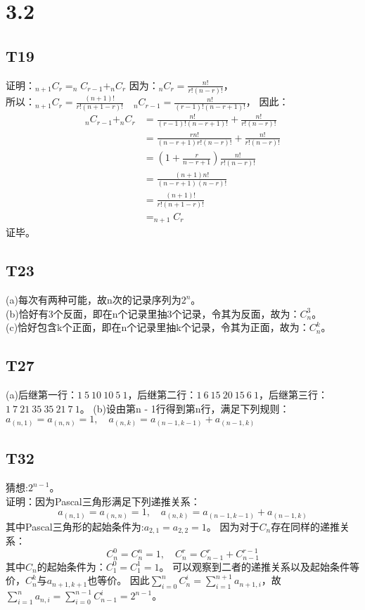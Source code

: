 \documentclass{article}
\begin{document}
\section{3.2}
\subsection{T19}
证明：$_{n+1}C_{r} = _nC_{r-1} + _nC_r$
因为：$_nC_r = \frac{n!}{r!(n-r)!}$，\\
所以：$_{n+1}C_r = \frac{(n + 1)!}{r!(n+1 - r)!} \quad _nC_{r-1} = \frac{n!}{(r - 1)!(n - r +  1)!}$，
因此：
\begin{align*}
    _nC_{r-1} + _nC_{r} &= \frac{n!}{(r - 1)!(n - r +  1)!} + \frac{n!}{r!(n-r)!}\\
    &= \frac{rn!}{(n - r + 1)r!(n-r)!} + \frac{n!}{r!(n-r)!}\\
    &= \left(1 + \frac{r}{n-r+1}\right)\frac{n!}{r!(n-r)!}\\
    &= \frac{(n + 1)n!}{(n - r + 1)(n-r)!}\\
    &= \frac{(n + 1)!}{r!(n+1 - r)!}\\
    &= _{n+1}C_r
\end{align*}证毕。
\subsection{T23}
(a)每次有两种可能，故n次的记录序列为$2^n$。\\
(b)恰好有3个反面，即在n个记录里抽3个记录，令其为反面，故为：$C_n^3$。\\
(c)恰好包含k个正面，即在n个记录里抽k个记录，令其为正面，故为：$C_n^k$。
\subsection{T27}
(a)后继第一行：$1 \ 5 \ 10 \ 10 \ 5 \ 1$，后继第二行：$1 \ 6 \ 15 \ 20 \ 15 \ 6 \ 1$，后继第三行：
$1 \ 7 \ 21 \ 35 \ 35 \ 21 \ 7 \ 1$。
(b)设由第n - 1行得到第n行，满足下列规则：$a_{(n,1)} = a_{(n, n)} = 1,\quad a_{(n, k)} = a_{(n-1, k - 1)} + a_{(n-1, k)}$
\subsection{T32}
猜想:$2^{n - 1}$。\\
证明：因为Pascal三角形满足下列递推关系：$$a_{(n,1)} = a_{(n, n)} = 1,\quad a_{(n, k)} = a_{(n-1, k - 1)} + a_{(n-1, k)}$$
其中Pascal三角形的起始条件为:$a_{2, 1} = a_{2, 2} = 1$。
因为对于$C_n$存在同样的递推关系：$$C_n^0 = C_n^n = 1, \quad C_n^r = C_{n-1}^r + C_{n - 1}^{r - 1}$$
其中$C_n$的起始条件为：$C_1^0 = C_1^1 = 1$。
可以观察到二者的递推关系以及起始条件等价，$C_n^k$与$a_{n + 1, k + 1}$也等价。
因此$\sum_{i = 0}^{n}C_n^i = \sum_{i = 1}^{n + 1}a_{n + 1, i}$，故$\sum_{i = 1}^{n}a_{n, i} = 
\sum_{i = 0}^{n - 1}C_{n - 1}^i = 2^{n - 1}$。
\end{document}
